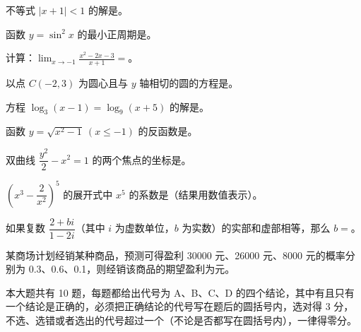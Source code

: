 \begin{question}
不等式 $|x+1|<1$ 的解是\gkblank{}。

\end{question}
\begin{question}
函数 $y=\sin^2 x$ 的最小正周期是\gkblank{}。

\end{question}
\begin{question}
计算：$\displaystyle\lim_{x\to-1}\frac{x^2-2x-3}{x+1}=$\gkblank{}。

\end{question}
\begin{question}
以点 $C(-2,3)$ 为圆心且与 $y$ 轴相切的圆的方程是\gkblank{}。

\end{question}
\begin{question}
方程 $\log_3(x-1)=\log_9(x+5)$ 的解是\gkblank{}。

\end{question}
\begin{question}
函数 $y=\sqrt{x^2-1}\ (x\le -1)$ 的反函数是\gkblank{}。

\end{question}
\begin{question}
双曲线 $\dfrac{y^2}{2}-x^2=1$ 的两个焦点的坐标是\gkblank{}。

\end{question}
\begin{question}
$\left(x^3-\dfrac{2}{x^2}\right)^5$ 的展开式中 $x^5$ 的系数是\gkblank{}（结果用数值表示）。

\end{question}
\begin{question}
如果复数 $\dfrac{2+bi}{1-2i}$（其中 $i$ 为虚数单位，$b$ 为实数）的实部和虚部相等，那么 $b=$\gkblank{}。

\end{question}
\begin{question}
某商场计划经销某种商品，预测可得盈利 30000 元、26000 元、8000 元的概率分别为 0.3、0.6、0.1，则经销该商品的期望盈利为\gkblank{}元。

\end{question}

本大题共有 10 题，每题都给出代号为 A、B、C、D 的四个结论，其中有且只有一个结论是正确的，必须把正确结论的代号写在题后的圆括号内，选对得 3 分，不选、选错或者选出的代号超过一个（不论是否都写在圆括号内），一律得零分。


